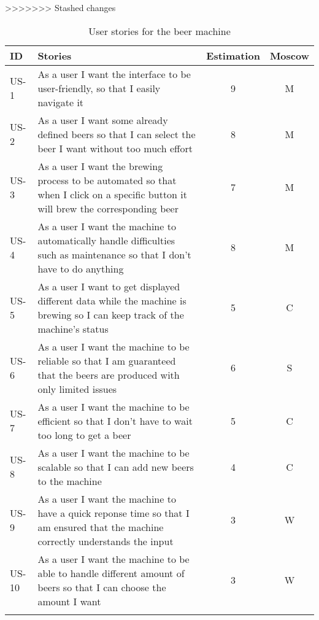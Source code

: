 >>>>>>> Stashed changes
\begin{table}[H]
    \begin{center}
        \sloppy
        \begin{longtable}{|p{1cm}|p{11cm}|c|c|}
            \hline
            ID    & Stories                                                                                                                                    & Estimation & Moscow \\ \hline
            US-1  & As a user I want the interface to be user-friendly, so that I easily navigate it                                                           & 9          & M      \\ \hline
            US-2  & As a user I want some already defined beers so that I can select the beer I want without too much effort                                   & 8          & M      \\ \hline
            US-3  & As a user I want the brewing process to be automated so that when I click on a specific button it will brew the corresponding beer         & 7          & M      \\ \hline
            US-4  & As a user I want the machine to automatically handle difficulties such as maintenance so that I don't have to do anything                  & 8          & M      \\ \hline
            US-5  & As a user I want to get displayed different data while the machine is brewing so I can keep track of the machine's status                  & 5          & C      \\ \hline
            US-6  & As a user I want the machine to be reliable so that I am guaranteed that the beers are produced with only limited issues                   & 6          & S      \\ \hline
            US-7  & As a user I want the machine to be efficient so that I don't have to wait too long to get a beer                                           & 5          & C      \\ \hline
            US-8  & As a user I want the machine to be scalable so that I can add new beers to the machine                                                     & 4          & C      \\ \hline
            US-9  & As a user I want the machine to have a quick reponse time so that I am ensured that the machine correctly understands the input            & 3          & W      \\ \hline
            US-10 & As a user I want the machine to be able to handle different amount of beers so that I can choose the amount I want                         & 3          & W      \\ \hline

            \caption{User stories for the beer machine}
            \label{tab:user_stories}
        \end{longtable}
    \end{center}
\end{table}